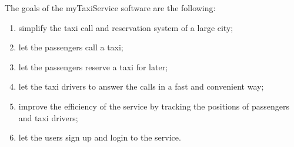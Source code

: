 The goals of the myTaxiService software are the following:
\begin{enumerate}
\item simplify the taxi call and reservation system of a large city;
\item let the passengers call a taxi;
\item let the passengers reserve a taxi for later;
\item let the taxi drivers to answer the calls in a fast and convenient way;
\item improve the efficiency of the service by tracking the positions of passengers and taxi drivers;
\item let the users sign up and login to the service.
\end{enumerate}